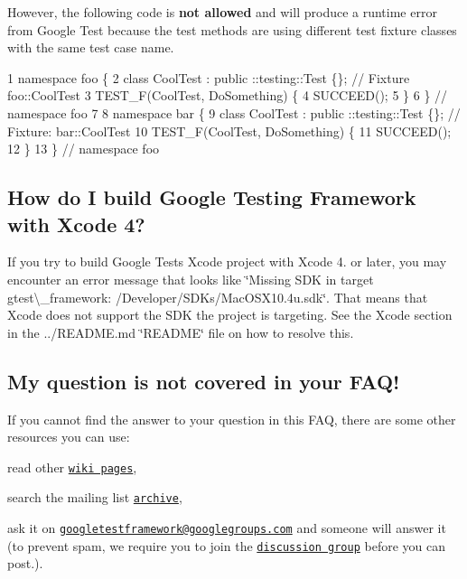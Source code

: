 However, the following code is {\bfseries not allowed} and will produce a runtime error from Google Test because the test methods are using different test fixture classes with the same test case name.


\begin{DoxyCode}
1 namespace foo \{
2 class CoolTest : public ::testing::Test \{\};  // Fixture foo::CoolTest
3 TEST\_F(CoolTest, DoSomething) \{
4   SUCCEED();
5 \}
6 \}  // namespace foo
7 
8 namespace bar \{
9 class CoolTest : public ::testing::Test \{\};  // Fixture: bar::CoolTest
10 TEST\_F(CoolTest, DoSomething) \{
11   SUCCEED();
12 \}
13 \}  // namespace foo
\end{DoxyCode}


\subsection*{How do I build Google Testing Framework with Xcode 4?}

If you try to build Google Test\textquotesingle{}s Xcode project with Xcode 4. or later, you may encounter an error message that looks like \char`\"{}\+Missing S\+D\+K in target gtest\textbackslash{}\+\_\+framework\+: /\+Developer/\+S\+D\+Ks/\+Mac\+O\+S\+X10.\+4u.\+sdk\char`\"{}. That means that Xcode does not support the S\+DK the project is targeting. See the Xcode section in the ../\+R\+E\+A\+D\+ME.md \char`\"{}\+R\+E\+A\+D\+M\+E\char`\"{} file on how to resolve this.

\subsection*{My question is not covered in your F\+A\+Q!}

If you cannot find the answer to your question in this F\+AQ, there are some other resources you can use\+:


\begin{DoxyEnumerate}
\item read other \href{../docs}{\tt wiki pages},
\end{DoxyEnumerate}
\begin{DoxyEnumerate}
\item search the mailing list \href{https://groups.google.com/forum/#!forum/googletestframework}{\tt archive},
\end{DoxyEnumerate}
\begin{DoxyEnumerate}
\item ask it on \href{mailto:googletestframework@googlegroups.com}{\tt googletestframework@googlegroups.\+com} and someone will answer it (to prevent spam, we require you to join the \href{http://groups.google.com/group/googletestframework}{\tt discussion group} before you can post.).
\end{DoxyEnumerate}

